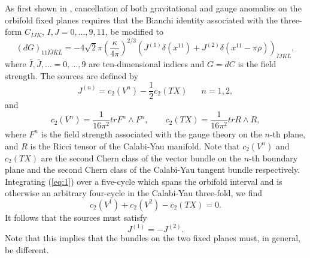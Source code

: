 \documentclass[a4paper,12pt]{article}
\numberwithin{equation}{section}
\theoremstyle{plain}
\begin{document}
As first shown in \cite{HW}, cancellation of both gravitational and gauge anomalies
on the orbifold fixed planes requires that the Bianchi identity associated
with the three-form $C_{IJK}$, $I,J=0,\dots,9,11$, be modified to
%
\begin{equation}
(dG)_{11\bar{I}\bar{J}\bar{K}\bar{L}}=-4\sqrt{2}\pi\left(\frac{\kappa}
{4\pi}\right)^{2/3}(J^{(1)}\delta(x^{11}) + J^{(2)}\delta(x^{11}-\pi\rho))_{\bar{I}
\bar{J}\bar{K}\bar{L}},
\label{eq:1}
\end{equation}
%
where $\bar{I},\bar{J},\dots=0,\dots,9$ are ten-dimensional indices and $G=dC$
is the field strength. The sources are defined by
%
\begin{equation}
J^{(n)}= c_{2}(V^{n})-\frac{1}{2}c_{2}(TX) \;\;\;\;\;\; n=1,2,
\label{eq:2}
\end{equation}
%
and
%
\begin{equation}
c_{2}(V^{n})=\frac{1}{16\pi^{2}}trF^{n} \wedge F^{n}, \qquad
c_{2}(TX)=\frac{1}{16\pi^{2}}trR \wedge R,
\label{eq:3}
\end{equation}
%
where $F^{n}$ is the field strength associated with the gauge theory on the $n$-th plane, and $R$ is the Ricci tensor of the Calabi-Yau manifold.
Note that $c_{2}(V^{n})$ and $c_{2}(TX)$ are the second Chern class of the
vector bundle on the $n$-th boundary plane and the second Chern class of the
Calabi-Yau tangent bundle respectively. Integrating (\ref{eq:1}) over a
five-cycle which spans the orbifold interval and is otherwise an arbitrary
four-cycle in the Calabi-Yau three-fold, we find
%
\begin{equation}
c_{2}(V^{1})+c_{2}(V^{2})-c_{2}(TX)=0.
\label{eq:4}
\end{equation}
%
It follows that the sources must satisfy
%
\begin{equation}
J^{(1)}=-J^{(2)}.
\label{eq:5}
\end{equation}
%
Note that this implies that the bundles on the two fixed planes must, in
general, be different.
\end{document}
